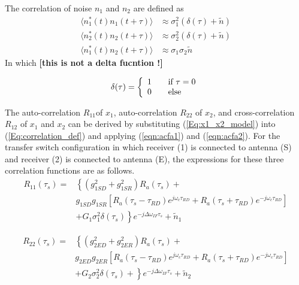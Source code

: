 \documentclass[draftcls,onecolumn]{IEEEtran}  %
\begin{document}
The correlation of noise $n_1$ and $n_2$ are defined as
\begin{equation}
\begin{split}
	\langle n_1^*(t)n_1(t +\tau)\rangle &\approx \sigma^2_1 (\delta(\tau) +\tilde{n})\\
    \langle n_2^*(t)n_2(t +\tau)\rangle &\approx \sigma^2_2 (\delta(\tau) +\tilde{n})\\
    \langle n_1^*(t)n_2(t +\tau)\rangle &\approx \sigma_1 \sigma_2 \tilde{n}
 \end{split}
\end{equation}
In which \bf [this is not a delta fucntion !] \rm
	
\[ \delta(\tau) = \left\{ 
  \begin{array}{l l}
    1 & \quad \text{if $\tau=0$}\\
    0 & \quad \text{else}
  \end{array} \right.\]


 The auto-correlation $R_{11}$of $x_1$, auto-correlation $R_{22}$ of $x_2$, and cross-correlation $R_{12}$ of $x_1$ and $x_2$ can be derived by substituting (\ref{Eq:x1_x2_model}) into (\ref{Eq:correlation_def}) and applying (\ref{eqn:acfa1}) and (\ref{eqn:acfa2}). 
  For the transfer switch configuration in which receiver (1) is connected to antenna (S) and receiver (2) is connected to antenna (E), the expressions for these three correlation functions are as follows. 
\begin{equation}
    \begin{split}
	R_{11}(\tau_s) =  & \left\{  
      \left( g^2_{1SD} + g^2_{1SR} \right) R_a(\tau_s) + 
      \right. \\
       & g_{1SD} g_{1SR} 
     \left[ 
          R_a(\tau_s-\tau_{RD})  e^{j\omega_c \tau_{RD}}+ 
          R_a(\tau_s+\tau_{RD}) e^{-j\omega_c \tau_{RD} }
     \right] \\
      &+  \left. G_1\sigma^2_1 \delta(\tau_s)   \right\} 
      e^{-j\Delta\omega_{IF}\tau_s}+ \tilde{n}_1    
   \label{Eq:R11}
   \end{split}
\end{equation}

\begin{equation}
    \begin{split}
	R_{22}(\tau_s) =  & \left\{  
      \left( g^2_{2ED} + g^2_{2ER} \right) R_a(\tau_s) + 
      \right. \\
       & g_{2ED} g_{2ER} 
     \left[ 
          R_a(\tau_s-\tau_{RD})  e^{j\omega_c \tau_{RD}}+ 
          R_a(\tau_s+\tau_{RD}) e^{-j\omega_c \tau_{RD} }
     \right] \\
      &+  \left. G_2\sigma^2_2 \delta(\tau_s) +   \right\} 
      e^{-j\Delta\omega_{IF}\tau_s}+ \tilde{n}_2    
   \label{Eq:R22}
   \end{split}
\end{equation}
\end{document}
